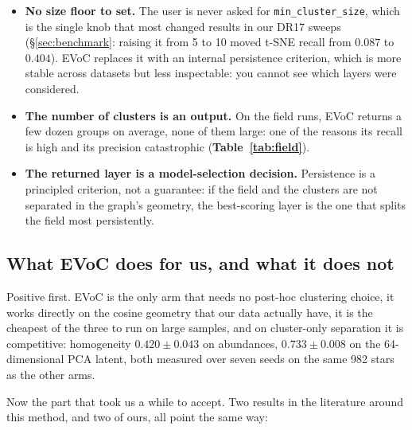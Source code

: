 \begin{itemize}
\item \textbf{No size floor to set.} The user is never asked for
  \texttt{min\_cluster\_size}, which is the single knob that most changed
  results in our DR17 sweeps (\S\ref{sec:benchmark}: raising it from 5 to 10
  moved t-SNE recall from $0.087$ to $0.404$). EVoC replaces it with an
  internal persistence criterion, which is more stable across datasets but
  less inspectable: you cannot see which layers were considered.
\item \textbf{The number of clusters is an output.} On the field runs, EVoC
returns a few dozen groups on average, none of them large: one of the reasons
its recall is high and its precision catastrophic
(\textbf{Table~\ref{tab:field}}).
\item \textbf{The returned layer is a model-selection decision.} Persistence
  is a principled criterion, not a guarantee: if the field and the clusters
  are not separated in the graph's geometry, the best-scoring layer is the one
  that splits the field most persistently.
\end{itemize}

\subsection{What EVoC does for us, and what it does not}

Positive first. EVoC is the only arm that needs no post-hoc clustering choice,
it works directly on the cosine geometry that our data actually have, it is
the cheapest of the three to run on large samples, and on cluster-only
separation it is competitive: homogeneity $0.420 \pm 0.043$ on abundances,
$0.733 \pm 0.008$ on the 64-dimensional PCA latent, both measured over seven
seeds on the same 982 stars as the other arms.

Now the part that took us a while to accept. Two results in the literature
around this method, and two of ours, all point the same way:

